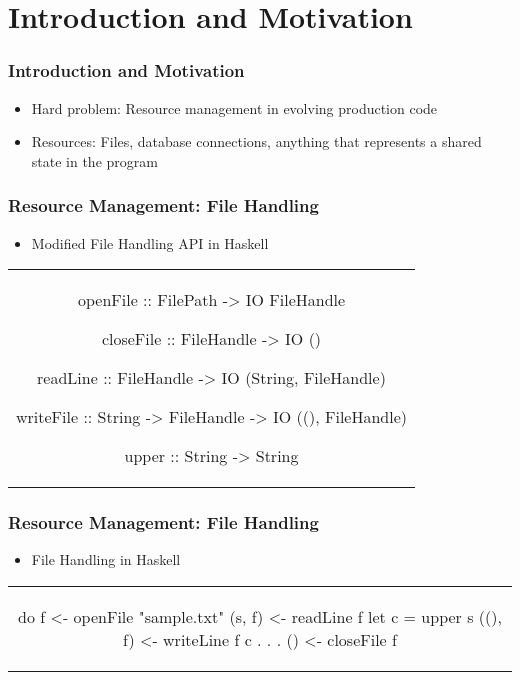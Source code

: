 \section{Introduction and Motivation}\label{sec:introduction}

\begin{frame}
\frametitle{Introduction and Motivation}
\begin{itemize}
\item Hard problem: Resource management in evolving production code
\item Resources: Files, database connections, anything that represents a shared state in the program
\end{itemize}
\end{frame}

\begin{frame}[fragile, c]
  \frametitle{Resource Management: File Handling}
  \begin{center}
    \begin{itemize}
    \item Modified File Handling API in Haskell
    \end{itemize}
    \begin{tabular}[h]{c}
      \begin{haskell}
     openFile  :: FilePath   -> IO FileHandle

     closeFile :: FileHandle -> IO ()

     readLine  :: FileHandle -> IO (String, FileHandle)

     writeFile :: String     -> FileHandle
                             -> IO ((), FileHandle)


     upper     :: String     -> String
      \end{haskell}
    \end{tabular}
\end{center}
\end{frame}

\begin{frame}[fragile,c]
  \frametitle{Resource Management: File Handling}
  \begin{center}
    \begin{itemize}
    \item File Handling in Haskell
    \end{itemize}
    \begin{tabular}[h]{c}
      \begin{haskell}
        do f  <- openFile "sample.txt"
           (s, f)  <- readLine f
           let c = upper s
           ((), f) <- writeLine f c
                  .
                  .
                  .
           () <- closeFile f
      \end{haskell}
    \end{tabular}
  \end{center}
\end{frame}

